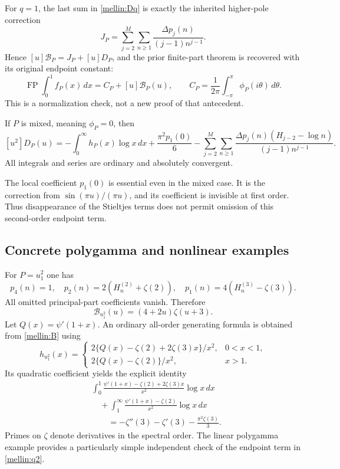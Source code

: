 For $q=1$, the last sum in \eqref{mellin:Dq} is exactly the inherited
higher-pole correction
\[
 J_P=\sum_{j=2}^{M}\sum_{n\ge1}
              \frac{\Delta p_j(n)}{(j-1)n^{j-1}}.
\]
Hence $[u]\mathcal B_P=J_P+[u]D_P$, and the prior finite-part theorem
is recovered with its original endpoint constant:
\[
 \operatorname{FP}\int_0^1f_P(x)\,dx
       =C_P+[u]\mathcal B_P(u),\qquad
 C_P=\frac1{2\pi}\int_{-\pi}^{\pi}\phi_P(i\theta)\,d\theta.
\]
This is a normalization check, not a new proof of that antecedent.

\begin{corollary}
\label{mellin:mixedq2}
If $P$ is mixed, meaning $\phi_P=0$, then
\begin{equation}\label{mellin:q2}
 \boxed{[u^2]D_P(u)=
 -\int_0^\infty h_P(x)\log x\,dx+\frac{\pi^2p_1(0)}6
 -\sum_{j=2}^{M}\sum_{n\ge1}
 \frac{\Delta p_j(n)(H_{j-2}-\log n)}{(j-1)n^{j-1}}.}
\end{equation}
All integrals and series are ordinary and absolutely convergent.
\end{corollary}

The local coefficient $p_1(0)$ is essential even in the mixed case.
It is the correction from $\sin(\pi u)/(\pi u)$, and its coefficient
is invisible at first order.  Thus disappearance of the Stieltjes
terms does not permit omission of this second-order endpoint term.

\subsection{Concrete polygamma and nonlinear examples}

For $P=u_1^2$ one has
\[
 p_4(n)=1,\quad p_2(n)=2(H_n^{(2)}+\zeta(2)),\quad
 p_1(n)=4(H_n^{(3)}-\zeta(3)).
\]
All omitted principal-part coefficients vanish.  Therefore
\begin{equation}\label{mellin:trigammasquare}
 \mathcal B_{u_1^2}(u)=(4+2u)\zeta(u+3).
\end{equation}
Let $Q(x)=\psi'(1+x)$.  An ordinary all-order generating formula is
obtained from \eqref{mellin:B} using
\[
 h_{u_1^2}(x)=
 \begin{cases}
 2\{Q(x)-\zeta(2)+2\zeta(3)x\}/x^2,&0<x<1,\\
 2\{Q(x)-\zeta(2)\}/x^2,&x>1.
 \end{cases}
\]
Its quadratic coefficient yields the explicit identity
\begin{equation}\label{mellin:trigamma-log}
 \boxed{\begin{aligned}
 &\int_0^1\frac{\psi'(1+x)-\zeta(2)+2\zeta(3)x}{x^2}\log x\,dx\\
 &\quad+\int_1^\infty\frac{\psi'(1+x)-\zeta(2)}{x^2}\log x\,dx\\
 &\qquad=-\zeta''(3)-\zeta'(3)-\frac{\pi^2\zeta(3)}3.
 \end{aligned}}
\end{equation}
Primes on $\zeta$ denote derivatives in the spectral order.  The
linear polygamma example provides a particularly simple independent
check of the endpoint term in \eqref{mellin:q2}.

